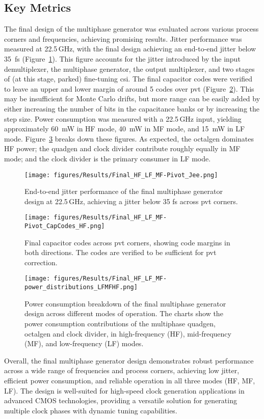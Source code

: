 \subsection{Key Metrics}\label{final_key_metrics}
The final design of the multiphase generator was evaluated across various process corners and frequencies, achieving promising results. 
Jitter performance was measured at 22.5\,GHz, with the final design achieving an end-to-end jitter below 35~fs (Figure~\ref{fig:final_jitter}). This figure accounts for the jitter introduced by the input demultiplexer, the multiphase generator, the output multiplexer, and two stages of (at this stage, parked) fine-tuning \gls{csi}.
The final capacitor codes were verified to leave an upper and lower margin of around 5 codes over \gls{pvt} (Figure~\ref{fig:final_codes}). This may be insufficient for Monte Carlo drifts, but more range can be easily added by either increasing the number of bits in the capacitance banks or by increasing the step size.
Power consumption was measured with a 22.5\,GHz input, yielding approximately 60~mW in HF mode, 40~mW in MF mode, and 15~mW in LF mode. Figure~\ref{fig:power_consumption} breaks down these figures. As expected, the \gls{octalgen} dominates HF power; the \gls{quadgen} and clock divider contribute roughly equally in MF mode; and the clock divider is the primary consumer in LF mode.
\begin{figure}[h]
  \centering
  \texttt{[image: figures/Results/Final\_HF\_LF\_MF-Pivot\_Jee.png]}
  \caption{End-to-end jitter performance of the final multiphase generator design at 22.5\,GHz, achieving a jitter below 35 fs across \gls{pvt} corners.}
  \label{fig:final_jitter}
\end{figure}
\begin{figure}[h]
  \centering
  \texttt{[image: figures/Results/Final\_HF\_LF\_MF-Pivot\_CapCodes\_HF.png]}
  \caption{Final capacitor codes across \gls{pvt} corners, showing code margins in both directions. The codes are verified to be sufficient for \gls{pvt} correction.}
  \label{fig:final_codes}
\end{figure}
\begin{figure}[h]
  \centering
  \texttt{[image: figures/Results/Final\_HF\_LF\_MF-power\_distributions\_LFMFHF.png]}
  \caption{Power consumption breakdown of the final multiphase generator design across different modes of operation. The charts show the power consumption contributions of the multiphase \gls{quadgen}, \gls{octalgen} and clock divider, in high-frequency (HF), mid-frequency (MF), and low-frequency (LF) modes.}
  \label{fig:power_consumption}
\end{figure}
Overall, the final multiphase generator design demonstrates robust performance across a wide range of frequencies and process corners, achieving low jitter, efficient power consumption, and reliable operation in all three modes (HF, MF, LF). The design is well-suited for high-speed clock generation applications in advanced CMOS technologies, providing a versatile solution for generating multiple clock phases with dynamic tuning capabilities.